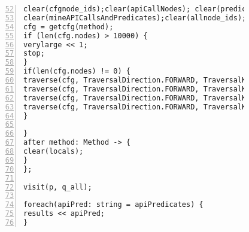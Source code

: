 \begin{figure}[ht!]
\begin{lstlisting}[numbers=left, tabsize=4, escapechar=@, caption={API Precondition Mining Analysis},label={lst:apm-code}, firstline = 52, firstnumber = 52, lastline = 112]
clear(cfgnode_ids);clear(apiCallNodes); clear(predicateExprsAtNodes);
clear(mineAPICallsAndPredicates);clear(allnode_ids);clear(cfg_dom); clear(dom_result);
cfg = getcfg(method);
if (len(cfg.nodes) > 10000) {
verylarge << 1;
stop;
}
if(len(cfg.nodes) != 0) {
traverse(cfg, TraversalDirection.FORWARD, TraversalKind.HYBRID, mineAPICallsAndPredicates);
traverse(cfg, TraversalDirection.FORWARD, TraversalKind.HYBRID, allnode_ids);
traverse(cfg, TraversalDirection.FORWARD, TraversalKind.HYBRID, cfg_dom, fixp1);
traverse(cfg, TraversalDirection.FORWARD, TraversalKind.HYBRID, dom_result);
}

}
after method: Method -> {
clear(locals);    
}
};

visit(p, q_all);

foreach(apiPred: string = apiPredicates) {
results << apiPred;                
}
\end{lstlisting}
\end{figure}